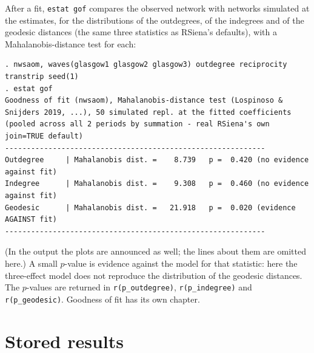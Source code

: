 After a fit, \texttt{estat gof} compares the observed network with networks simulated at the estimates, for the distributions of the outdegrees, of the indegrees and of the geodesic distances (the same three statistics as RSiena's defaults), with a Mahalanobis-distance test for each:
\begin{lstlisting}
. nwsaom, waves(glasgow1 glasgow2 glasgow3) outdegree reciprocity transtrip seed(1)
. estat gof
Goodness of fit (nwsaom), Mahalanobis-distance test (Lospinoso & Snijders 2019, ...), 50 simulated repl. at the fitted coefficients
(pooled across all 2 periods by summation - real RSiena's own join=TRUE default)
------------------------------------------------------------
Outdegree     | Mahalanobis dist. =    8.739   p =  0.420 (no evidence against fit)
Indegree      | Mahalanobis dist. =    9.308   p =  0.460 (no evidence against fit)
Geodesic      | Mahalanobis dist. =   21.918   p =  0.020 (evidence AGAINST fit)
------------------------------------------------------------
\end{lstlisting}
(In the output the plots are announced as well; the lines about them are omitted here.) A small $p$-value is evidence against the model for that statistic: here the three-effect model does not reproduce the distribution of the geodesic distances. The $p$-values are returned in \texttt{r(p\_outdegree)}, \texttt{r(p\_indegree)} and \texttt{r(p\_geodesic)}. Goodness of fit has its own chapter.

\section{Stored results}\label{sec:eresults}

